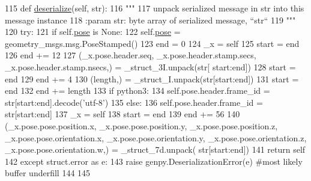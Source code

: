 \begin{DoxyCode}
115   \textcolor{keyword}{def }\hyperlink{classjaco__msgs_1_1msg_1_1__ArmPoseResult_1_1ArmPoseResult_a790fee86b6ab3f966b1429a12fea923a}{deserialize}(self, str):
116     \textcolor{stringliteral}{"""}
117 \textcolor{stringliteral}{    unpack serialized message in str into this message instance}
118 \textcolor{stringliteral}{    :param str: byte array of serialized message, ``str``}
119 \textcolor{stringliteral}{    """}
120     \textcolor{keywordflow}{try}:
121       \textcolor{keywordflow}{if} self.\hyperlink{classjaco__msgs_1_1msg_1_1__ArmPoseResult_1_1ArmPoseResult_a1ecfceb51d3dc9aa38ea12a77158af38}{pose} \textcolor{keywordflow}{is} \textcolor{keywordtype}{None}:
122         self.\hyperlink{classjaco__msgs_1_1msg_1_1__ArmPoseResult_1_1ArmPoseResult_a1ecfceb51d3dc9aa38ea12a77158af38}{pose} = geometry\_msgs.msg.PoseStamped()
123       end = 0
124       \_x = self
125       start = end
126       end += 12
127       (\_x.pose.header.seq, \_x.pose.header.stamp.secs, \_x.pose.header.stamp.nsecs,) = \_struct\_3I.unpack(str[
      start:end])
128       start = end
129       end += 4
130       (length,) = \_struct\_I.unpack(str[start:end])
131       start = end
132       end += length
133       \textcolor{keywordflow}{if} python3:
134         self.pose.header.frame\_id = str[start:end].decode(\textcolor{stringliteral}{'utf-8'})
135       \textcolor{keywordflow}{else}:
136         self.pose.header.frame\_id = str[start:end]
137       \_x = self
138       start = end
139       end += 56
140       (\_x.pose.pose.position.x, \_x.pose.pose.position.y, \_x.pose.pose.position.z, 
      \_x.pose.pose.orientation.x, \_x.pose.pose.orientation.y, \_x.pose.pose.orientation.z, \_x.pose.pose.orientation.w,) = \_struct\_7d.unpack(
      str[start:end])
141       \textcolor{keywordflow}{return} self
142     \textcolor{keywordflow}{except} struct.error \textcolor{keyword}{as} e:
143       \textcolor{keywordflow}{raise} genpy.DeserializationError(e) \textcolor{comment}{#most likely buffer underfill}
144 
145 
\end{DoxyCode}
